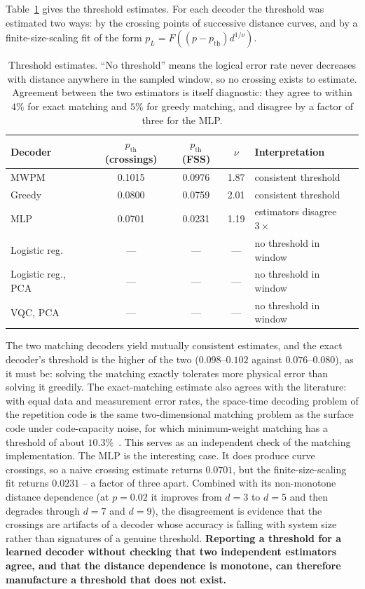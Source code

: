 \documentclass[Thesis.tex]{subfiles}
\begin{document}
Table~\ref{tab:ch6_threshold} gives the threshold estimates. For each decoder the
threshold was estimated two ways: by the crossing points of successive
distance curves, and by a finite-size-scaling fit of the form
$p_L = F\!\left((p - p_{\text{th}}) d^{1/\nu}\right)$.

\begin{table}[htbp]
\centering
\caption[Threshold estimates]{Threshold estimates. ``No threshold'' means the logical error rate never
decreases with distance anywhere in the sampled window, so no crossing exists to
estimate. Agreement between the two estimators is itself diagnostic: they agree to
within $4\%$ for exact matching and $5\%$ for greedy matching, and disagree by a
factor of three for the MLP.}
\label{tab:ch6_threshold}
\small
\begin{tabular}{lcccl}
\toprule
\textbf{Decoder} & \textbf{$p_{\text{th}}$ (crossings)} & \textbf{$p_{\text{th}}$ (FSS)}
& \textbf{$\nu$} & \textbf{Interpretation} \\
\midrule
MWPM               & 0.1015 & 0.0976 & 1.87 & consistent threshold \\
Greedy             & 0.0800 & 0.0759 & 2.01 & consistent threshold \\
MLP                & 0.0701 & 0.0231 & 1.19 & estimators disagree $3\times$ \\
Logistic reg.      & --- & --- & --- & no threshold in window \\
Logistic reg., PCA & --- & --- & --- & no threshold in window \\
VQC, PCA           & --- & --- & --- & no threshold in window \\
\bottomrule
\end{tabular}
\end{table}

The two matching decoders yield mutually consistent estimates, and the exact
decoder's threshold is the higher of the two ($0.098$--$0.102$ against
$0.076$--$0.080$), as it must be: solving the matching exactly tolerates more
physical error than solving it greedily. The exact-matching estimate also agrees with
the literature: with equal data and measurement error rates, the space-time
decoding problem of the repetition code is the same two-dimensional matching problem
as the surface code under code-capacity noise, for which minimum-weight matching has
a threshold of about $10.3\%$~\cite{bonillaataides2021xzzx}. This serves as an
independent check of the matching implementation. The MLP is the interesting case. It does
produce curve crossings, so a naive crossing estimate returns $0.0701$, but the
finite-size-scaling fit returns $0.0231$ -- a factor of three apart. Combined with
its non-monotone distance dependence (at $p = 0.02$ it improves from $d = 3$ to
$d = 5$ and then degrades through $d = 7$ and $d = 9$), the disagreement is evidence
that the crossings are artifacts of a decoder whose accuracy is falling with system
size rather than signatures of a genuine threshold. \textbf{Reporting a threshold
for a learned decoder without checking that two independent estimators agree, and
that the distance dependence is monotone, can therefore manufacture a threshold that
does not exist.}
\end{document}
